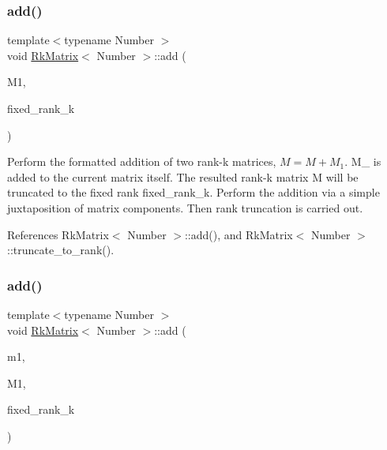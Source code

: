 \subsubsection{\texorpdfstring{add()}{add()}\hspace{0.1cm}{\footnotesize\ttfamily [7/8]}}
{\footnotesize\ttfamily template$<$typename Number $>$ \\
void \hyperlink{classRkMatrix}{Rk\+Matrix}$<$ Number $>$\+::add (\begin{DoxyParamCaption}\item[{const \hyperlink{classRkMatrix}{Rk\+Matrix}$<$ Number $>$ \&}]{M1,  }\item[{const \hyperlink{classRkMatrix_add060bfc3a4cc77f858c3d6dd58cadd5}{size\+\_\+type}}]{fixed\+\_\+rank\+\_\+k }\end{DoxyParamCaption})}

Perform the formatted addition of two rank-\/k matrices, $M = M + M_1$. {\ttfamily M\+\_} is added to the current matrix itself. The resulted rank-\/k matrix {\ttfamily M} will be truncated to the fixed rank {\ttfamily fixed\+\_\+rank\+\_\+k}. Perform the addition via a simple juxtaposition of matrix components. Then rank truncation is carried out.

References Rk\+Matrix$<$ Number $>$\+::add(), and Rk\+Matrix$<$ Number $>$\+::truncate\+\_\+to\+\_\+rank().

\mbox{\label{classRkMatrix_adb27c4eacf80d4e94c20ff96eaf5564d}} 
\subsubsection{\texorpdfstring{add()}{add()}\hspace{0.1cm}{\footnotesize\ttfamily [8/8]}}
{\footnotesize\ttfamily template$<$typename Number $>$ \\
void \hyperlink{classRkMatrix}{Rk\+Matrix}$<$ Number $>$\+::add (\begin{DoxyParamCaption}\item[{const Number}]{m1,  }\item[{const \hyperlink{classRkMatrix}{Rk\+Matrix}$<$ Number $>$ \&}]{M1,  }\item[{const \hyperlink{classRkMatrix_add060bfc3a4cc77f858c3d6dd58cadd5}{size\+\_\+type}}]{fixed\+\_\+rank\+\_\+k }\end{DoxyParamCaption})}

